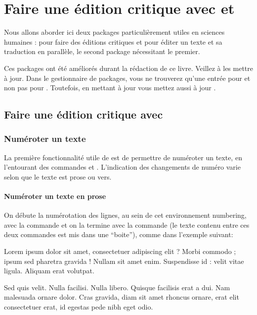 \chapter{Faire une édition critique avec  et } \label{ledmac}


\begin{prealable}
Nous allons aborder ici deux packages particulièrement utiles en sciences humaines :  pour faire des éditions critiques et  pour éditer un texte et sa traduction en parallèle, le second package nécessitant le premier.
\end{prealable}

\begin{attention}
Ces packages ont été améliorés durant la rédaction de ce livre. Veillez à les mettre à jour.
Dans le gestionnaire de packages, vous ne trouverez qu'une entrée pour   et non pas pour .  Toutefois, en mettant à jour  vous mettez aussi à jour  .
\end{attention}



\section{Faire une édition critique avec }

\subsection{Numéroter un texte}

La première fonctionnalité utile de  est  de permettre  de numéroter un texte, en l'entourant des commandes  et . L'indication des changements de numéro varie selon que le texte est prose ou vers.

\subsubsection{Numéroter un texte en prose}


On débute la numérotation des lignes, au sein de cet environnement numbering, avec la commande  et on la termine avec la commande  (le texte contenu entre ces deux commandes est mis dans une \enquote{boite}), comme dans l'exemple suivant:

\begin{latexcode}
\beginnumbering
\pstart %
Lorem ipsum dolor sit amet, consectetuer adipiscing elit ?
Morbi commodo ; ipsum sed pharetra gravida !
Nullam sit amet enim. Suspendisse id : velit vitae ligula.
Aliquam erat volutpat.

Sed quis velit. Nulla facilisi. Nulla libero. 
Quisque facilisis erat a dui. 
Nam malesuada ornare dolor.
Cras gravida, diam sit amet rhoncus ornare, 
erat  elit consectetuer erat, id egestas pede nibh eget odio.
\pend %
\endnumbering
\end{latexcode}

